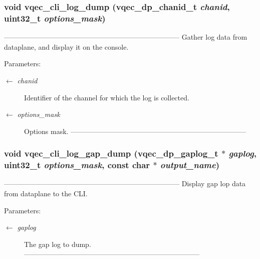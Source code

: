 \subsubsection{\setlength{\rightskip}{0pt plus 5cm}void vqec\_\-cli\_\-log\_\-dump (vqec\_\-dp\_\-chanid\_\-t {\em chanid}, uint32\_\-t {\em options\_\-mask})}\label{vqec__cli__interface_8h_395e4ac2acb88e5a62e18a071ee05066}


--------------------------------------------------------------------------- Gather log data from dataplane, and display it on the console.

\begin{Desc}
\item[Parameters:]
\begin{description}
\item[\mbox{$\leftarrow$} {\em chanid}]Identifier of the channel for which the log is collected. \item[\mbox{$\leftarrow$} {\em options\_\-mask}]Options mask. --------------------------------------------------------------------------- \end{description}
\end{Desc}
\subsubsection{\setlength{\rightskip}{0pt plus 5cm}void vqec\_\-cli\_\-log\_\-gap\_\-dump (vqec\_\-dp\_\-gaplog\_\-t $\ast$ {\em gaplog}, uint32\_\-t {\em options\_\-mask}, const char $\ast$ {\em output\_\-name})}\label{vqec__cli__interface_8h_5fbac07086a654a724f5dbdbca171a8f}


--------------------------------------------------------------------------- Display gap lop data from dataplane to the CLI.

\begin{Desc}
\item[Parameters:]
\begin{description}
\item[\mbox{$\leftarrow$} {\em gaplog}]The gap log to dump. --------------------------------------------------------------------------- \end{description}
\end{Desc}
